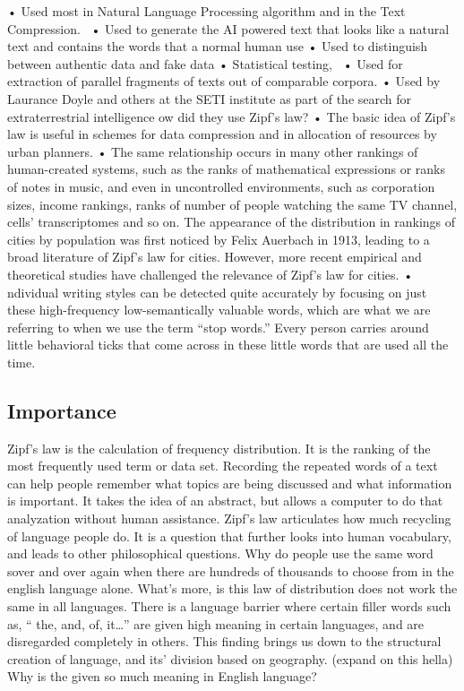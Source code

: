 \documentclass[a4paper,10pt]{article}
\begin{document}
• Used most in Natural Language Processing algorithm and in the Text Compression. 
• Used to generate the AI powered text that looks like a natural text and contains the words that a normal human use
• Used to distinguish between authentic data and fake data
• Statistical testing, 
• Used for extraction of parallel fragments of texts out of comparable corpora. 
• Used by Laurance Doyle and others at the SETI institute as part of the search for extraterrestrial intelligence ow did they use Zipf’s law?
• The basic idea of Zipf’s law is useful in schemes for data compression and in allocation of resources by urban planners.
• The same relationship occurs in many other rankings of human-created systems, such as the ranks of mathematical expressions or ranks of notes in music, and even in uncontrolled environments, such as corporation sizes, income rankings, ranks of number of people watching the same TV channel, cells' transcriptomes  and so on. The appearance of the distribution in rankings of cities by population was first noticed by Felix Auerbach in 1913, leading to a broad literature of Zipf's law for cities. However, more recent empirical and theoretical studies have challenged the relevance of Zipf's law for cities. 
• ndividual writing styles can be detected quite accurately by focusing on just these high-frequency low-semantically valuable words, which are what we are referring to when we use the term “stop words.”  Every person carries around little behavioral ticks that come across in these little words that are used all the time. 

\subsection{Importance}

Zipf’s law is the calculation of frequency distribution. It is the ranking of the most frequently used term or data set. Recording the repeated words of a text can help people remember what topics are being discussed and what information is important. It takes the idea of an abstract, but allows a computer to do that analyzation without human assistance. 
Zipf’s law articulates how much recycling of language people do. It is a question that further looks into human vocabulary, and leads to other philosophical questions. Why do people use the same word sover and over again when there are hundreds of thousands to choose from in the english language alone. What’s more, is this law of distribution does not work the same in all languages. There is a language barrier where certain filler words such as, “ the, and, of, it…” are given high meaning in certain languages, and are disregarded completely in others. This finding brings us down to the structural  creation of language, and its’ division based on geography. (expand on this hella) Why is the given so much meaning in English language?
\end{document}
